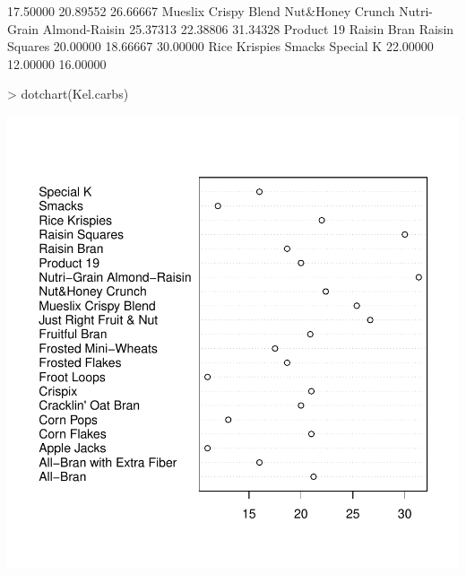\begin{Schunk}
\begin{Soutput}
                 17.50000                  20.89552                  26.66667 
     Mueslix Crispy Blend          Nut&Honey Crunch Nutri-Grain Almond-Raisin 
                 25.37313                  22.38806                  31.34328 
               Product 19               Raisin Bran            Raisin Squares 
                 20.00000                  18.66667                  30.00000 
            Rice Krispies                    Smacks                 Special K 
                 22.00000                  12.00000                  16.00000 
\end{Soutput}
\begin{Sinput}
> dotchart(Kel.carbs)
\end{Sinput}
\end{Schunk}
\includegraphics{lect_chapter5_v2-017}

